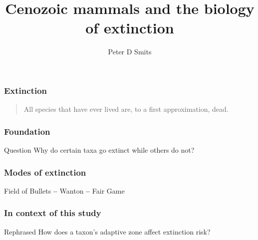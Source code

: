 \documentclass{beamer}
\title{Cenozoic mammals and the biology of extinction}
\author{Peter D Smits}
\institute{Committee on Evolutionary Biology, University of Chicago}
\begin{document}
\begin{frame}
  \maketitle
\end{frame}

\begin{frame}
  \frametitle{Extinction}
  \begin{quotation}
    All species that have ever lived are, to a first approximation, dead.

    \tiny{}
  \end{quotation}
\end{frame}

\begin{frame}
  \frametitle{Foundation}
  \begin{alertblock}{Question}
    Why do certain taxa go extinct while others do not?
  \end{alertblock}
\end{frame}

\begin{frame}
  \frametitle{Modes of extinction}

   Field of Bullets 
   \textbf{--} 
   Wanton 
   \textbf{--} 
   Fair Game 

  \bigskip

  \tiny{}

\end{frame}

\begin{frame}
  \frametitle{In context of this study}
  \begin{block}{Rephrased}
    How does a taxon's \alert{adaptive zone} affect \alert{extinction risk?}
  \end{block}
\end{frame}
\end{document}
